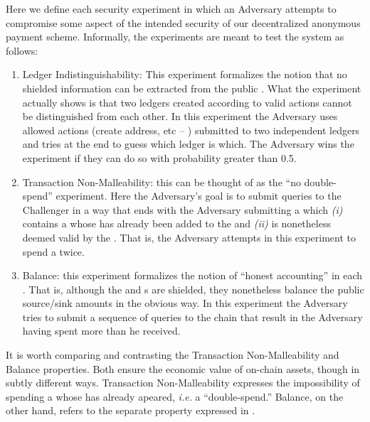 Here we define each security experiment in which an Adversary attempts to compromise some aspect of the intended security of our decentralized anonymous payment scheme.  Informally, the experiments are meant to test the system as follows:
\begin{enumerate}
    \item Ledger Indistinguishability: This experiment formalizes the notion that no shielded information can be extracted from the public \Ledger. What the experiment actually shows is that two ledgers created according to valid actions cannot be distinguished from each other. In this experiment the Adversary uses allowed actions (create address, etc -- ) submitted to two independent ledgers and tries at the end to guess which ledger is which.  The Adversary wins the experiment if they can do so with probability greater than 0.5.  
    \item Transaction Non-Malleability: this can be thought of as the ``no double-spend'' experiment.  Here the Adversary's goal is to submit queries to the Challenger in a way that ends with the Adversary submitting a \Transfer which \emph{(i)} contains a \UTXO whose \VoidNumber has already been added to the \VoidNumberSet and \emph{(ii)} is nonetheless deemed valid by the \Ledger.  That is, the Adversary attempts in this experiment to spend a \UTXO twice.
    \item Balance: this experiment formalizes the notion of ``honest accounting'' in each \Transfer.  That is, although the \Sender and \Receiver \AssetValue s are shielded, they nonetheless balance the public source/sink amounts in the obvious way.  In this experiment the Adversary tries to submit a sequence of queries to the chain that result in the Adversary having spent more than he received.  
\end{enumerate}
It is worth comparing and contrasting the Transaction Non-Malleability and Balance properties.  Both ensure the economic value of on-chain assets, though in subtly different ways.  Transaction Non-Malleability expresses the impossibility of spending a \UTXO whose \VoidNumber has already apeared, \emph{i.e.} a ``double-spend.'' Balance, on the other hand, refers to the separate property expressed in .
